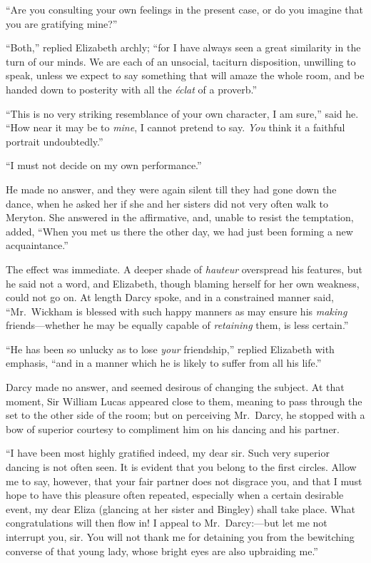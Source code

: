 \documentclass[12pt,english]{book}
\begin{document}
{}``Are you consulting your own feelings in the present case, or
do you imagine that you are gratifying mine?''

{}``Both,'' replied Elizabeth archly; {}``for I have always seen
a great similarity in the turn of our minds. We are each of an unsocial,
taciturn disposition, unwilling to speak, unless we expect to say
something that will amaze the whole room, and be handed down to posterity
with all the \emph{\'{e}clat} of a proverb.''

{}``This is no very striking resemblance of your own character, I
am sure,'' said he. {}``How near it may be to \textit{mine}, I cannot
pretend to say. \textit{You} think it a faithful portrait undoubtedly.''

{}``I must not decide on my own performance.''

He made no answer, and they were again silent till they had gone down
the dance, when he asked her if she and her sisters did not very often
walk to Meryton. She answered in the affirmative, and, unable to resist
the temptation, added, {}``When you met us there the other day, we
had just been forming a new acquaintance.''

The effect was immediate. A deeper shade of \emph{hauteur} overspread
his features, but he said not a word, and Elizabeth, though blaming
herself for her own weakness, could not go on. At length Darcy spoke,
and in a constrained manner said, {}``Mr.\ Wickham is blessed with
such happy manners as may ensure his \textit{making} friends\mbox{---}whether
he may be equally capable of \textit{retaining} them, is less certain.''

{}``He has been so unlucky as to lose \textit{your} friendship,''
replied Elizabeth with emphasis, {}``and in a manner which he is
likely to suffer from all his life.''

Darcy made no answer, and seemed desirous of changing the subject.
At that moment, Sir William Lucas appeared close to them, meaning
to pass through the set to the other side of the room; but on perceiving
Mr.\ Darcy, he stopped with a bow of superior courtesy to compliment
him on his dancing and his partner.

{}``I have been most highly gratified indeed, my dear sir. Such very
superior dancing is not often seen. It is evident that you belong
to the first circles. Allow me to say, however, that your fair partner
does not disgrace you, and that I must hope to have this pleasure
often repeated, especially when a certain desirable event, my dear
Eliza (glancing at her sister and Bingley) shall take place. What
congratulations will then flow in! I appeal to Mr.\ Darcy:\mbox{---}but
let me not interrupt you, sir. You will not thank me for detaining
you from the bewitching converse of that young lady, whose bright
eyes are also upbraiding me.''
\end{document}
